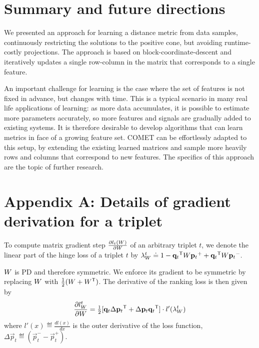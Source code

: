 \documentclass{article}
\begin{document}
\section{Summary and future directions}
We presented an approach for learning a distance metric from data samples,  continuously restricting the solutions to the positive cone, but avoiding runtime-costly projections. The approach is based on block-coordinate-descent and iteratively updates a single row-column in the matrix that corresponds to a single feature. 

An important challenge for learning is the case where the set of features is not fixed in advance, but changes with time. This is a typical scenario in many real life applications of learning: as more data accumulates, it is possible to estimate more parameters accurately, so more features and signals are gradually added to existing systems. It is therefore desirable to develop algorithms that can learn metrics in face of a growing feature set. COMET can be effortlessly adapted to this setup, by extending the existing learned matrices and sample more heavily rows and columns that correspond to new features. The specifics of this approach are the topic of further research.


\appendix
\section*{Appendix A: Details of gradient derivation for a triplet}
\label{appendix-grad}

To compute matrix gradient step  $\frac{\partial {l_t ({W})}}{\partial {W}}$ of an arbitrary triplet $t$, we denote the linear part of the hinge loss of a triplet $t$ by $\lambda_{W}^t \doteq 
1-{{\mathbf{q}}_{{t}}}{}^\mathsf{T} {W} {{\mathbf{p}}_{{t}}}^{+} + {{\mathbf{q}}_{{t}}}{}^\mathsf{T}{W}{{\mathbf{p}}_{{t}}}^{-}.$

${W}$ is PD and therefore symmetric. We enforce its gradient to be symmetric by replacing ${W}$ with $\tfrac{1}{2}({W} + {W}{}^\mathsf{T})$.
The derivative of the ranking loss is then given by
\begin{equation}
\frac{\partial {l_{{W}}^{t}}}{\partial {W}} = \tfrac{1}{2}[\mathbf{q}_{t}\Delta\mathbf{p}_{t}{}^\mathsf{T}  + \Delta\mathbf{p}_{t}\mathbf{q}_{t}{}^\mathsf{T}]\cdot {l'}(\lambda_{W}^t)
\label{dlossranking}
\end{equation} where $l'(x) \eqdef \frac{d{l(x)}}{dx}$ is the outer derivative of the loss function, $\Delta\vec{p}_{t} \eqdef (\vec{p}_{t}^{-} - \vec{p}_{t}^{+})$.
\end{document}
